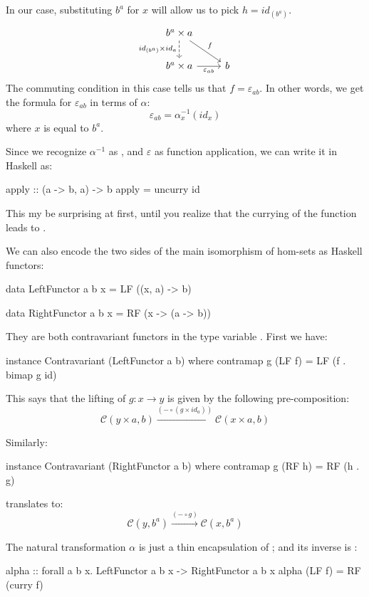 \documentclass[DaoFP]{subfiles}
\begin{document}
In our case, substituting $b^a$ for $x$ will allow us to pick $h = id_{(b^a)}$.
\[
 \begin{tikzcd}
 b^a \times a
 \arrow[d, dashed, "id_{(b^a)} \times id_a"']
 \arrow[rd, "f"]
 \\
 b^a \times a
 \arrow[r, "\varepsilon_{a b}"']
& b
 \end{tikzcd}
\]
The commuting condition in this case tells us that $f = \varepsilon_{a b}$. In other words, we get the formula for $\varepsilon_{a b}$ in terms of $\alpha$:
\[ \varepsilon_{a b} = \alpha_{x}^{-1} (id_{x}) \]
where $x$ is equal to $b^a$.


Since we recognize $\alpha^{-1}$ as , and $\varepsilon$ as function application, we can write it in Haskell as:
\begin{haskell}
apply :: (a -> b, a) -> b
apply = uncurry id
\end{haskell}
This my be surprising at first, until you realize that the currying of the function  leads to .

We can also encode the two sides of the main isomorphism of hom-sets as Haskell functors:
\begin{haskell}
data LeftFunctor  a b x = LF ((x, a) -> b)
\end{haskell}
\begin{haskell}
data RightFunctor a b x = RF (x -> (a -> b))
\end{haskell}
They are both contravariant functors in the type variable . First we have:
\begin{haskell}
instance Contravariant (LeftFunctor a b) where
  contramap g (LF f) = LF (f . bimap g id)
\end{haskell}
This says that the lifting of $g \colon x \to y$ is given by the following pre-composition:
\[ \mathcal{C}(y \times a, b) \xrightarrow{(- \circ (g \times id_a)) }  \mathcal{C}(x \times a, b)\]

Similarly:
\begin{haskell}
instance Contravariant (RightFunctor a b) where
  contramap g (RF h) = RF (h . g)
\end{haskell}
translates to:
\[  \mathcal{C}(y, b^a) \xrightarrow{ (- \circ g) } \mathcal{C}(x, b^a) \]

The natural transformation $\alpha$ is just a thin encapsulation of ; and its inverse is :

\begin{haskell}
alpha :: forall a b x. LeftFunctor a b x -> RightFunctor a b x
alpha (LF f) = RF (curry f)
\end{haskell}
\end{document}
